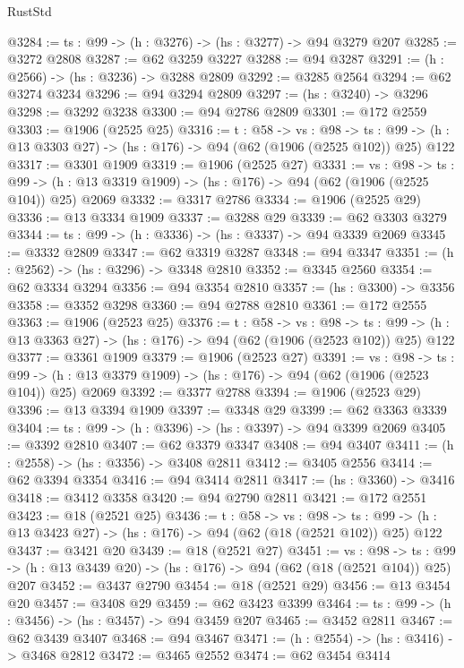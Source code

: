 \begin{lexlean}{RustStd}
\begin{coremodule}
{\begin{coremodule}
{{{{{{{{{@3284 := {ts : @99} -> (h : @3276) -> (hs : @3277) -> @94 @3279 @207
@3285 := @3272 @2808
@3287 := @62 @3259 @3227
@3288 := @94 @3287
@3291 := (h : @2566) -> (hs : @3236) -> @3288 @2809
@3292 := @3285 @2564
@3294 := @62 @3274 @3234
@3296 := @94 @3294 @2809
@3297 := (hs : @3240) -> @3296
@3298 := @3292 @3238
@3300 := @94 @2786 @2809
@3301 := @172 @2559
@3303 := @1906 (@2525 @25)
@3316 := {t : @58} ->
  {vs : @98} ->
  {ts : @99} -> (h : @13 @3303 @27) -> (hs : @176) -> @94 (@62 (@1906 (@2525 @102)) @25) @122
@3317 := @3301 @1909
@3319 := @1906 (@2525 @27)
@3331 := {vs : @98} ->
  {ts : @99} -> (h : @13 @3319 @1909) -> (hs : @176) -> @94 (@62 (@1906 (@2525 @104)) @25) @2069
@3332 := @3317 @2786
@3334 := @1906 (@2525 @29)
@3336 := @13 @3334 @1909
@3337 := @3288 @29
@3339 := @62 @3303 @3279
@3344 := {ts : @99} -> (h : @3336) -> (hs : @3337) -> @94 @3339 @2069
@3345 := @3332 @2809
@3347 := @62 @3319 @3287
@3348 := @94 @3347
@3351 := (h : @2562) -> (hs : @3296) -> @3348 @2810
@3352 := @3345 @2560
@3354 := @62 @3334 @3294
@3356 := @94 @3354 @2810
@3357 := (hs : @3300) -> @3356
@3358 := @3352 @3298
@3360 := @94 @2788 @2810
@3361 := @172 @2555
@3363 := @1906 (@2523 @25)
@3376 := {t : @58} ->
  {vs : @98} ->
  {ts : @99} -> (h : @13 @3363 @27) -> (hs : @176) -> @94 (@62 (@1906 (@2523 @102)) @25) @122
@3377 := @3361 @1909
@3379 := @1906 (@2523 @27)
@3391 := {vs : @98} ->
  {ts : @99} -> (h : @13 @3379 @1909) -> (hs : @176) -> @94 (@62 (@1906 (@2523 @104)) @25) @2069
@3392 := @3377 @2788
@3394 := @1906 (@2523 @29)
@3396 := @13 @3394 @1909
@3397 := @3348 @29
@3399 := @62 @3363 @3339
@3404 := {ts : @99} -> (h : @3396) -> (hs : @3397) -> @94 @3399 @2069
@3405 := @3392 @2810
@3407 := @62 @3379 @3347
@3408 := @94 @3407
@3411 := (h : @2558) -> (hs : @3356) -> @3408 @2811
@3412 := @3405 @2556
@3414 := @62 @3394 @3354
@3416 := @94 @3414 @2811
@3417 := (hs : @3360) -> @3416
@3418 := @3412 @3358
@3420 := @94 @2790 @2811
@3421 := @172 @2551
@3423 := @18 (@2521 @25)
@3436 := {t : @58} ->
  {vs : @98} ->
  {ts : @99} -> (h : @13 @3423 @27) -> (hs : @176) -> @94 (@62 (@18 (@2521 @102)) @25) @122
@3437 := @3421 @20
@3439 := @18 (@2521 @27)
@3451 := {vs : @98} ->
  {ts : @99} -> (h : @13 @3439 @20) -> (hs : @176) -> @94 (@62 (@18 (@2521 @104)) @25) @207
@3452 := @3437 @2790
@3454 := @18 (@2521 @29)
@3456 := @13 @3454 @20
@3457 := @3408 @29
@3459 := @62 @3423 @3399
@3464 := {ts : @99} -> (h : @3456) -> (hs : @3457) -> @94 @3459 @207
@3465 := @3452 @2811
@3467 := @62 @3439 @3407
@3468 := @94 @3467
@3471 := (h : @2554) -> (hs : @3416) -> @3468 @2812
@3472 := @3465 @2552
@3474 := @62 @3454 @3414
}}}}}}}}}
\end{coremodule}}
\end{coremodule}
\end{lexlean}

